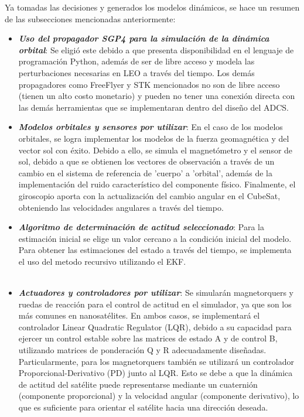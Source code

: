 Ya tomadas las decisiones y generados los modelos dinámicos, se hace un resumen de las subsecciones mencionadas anteriormente:

\begin{itemize}
	\item \textbf{\textit{Uso del propagador SGP4 para la simulación de la dinámica orbital}}: Se eligió este debido a que presenta disponibilidad en el lenguaje de programación Python, además de ser de libre acceso y modela las perturbaciones necesarias en LEO a través del tiempo. Los demás propagadores como FreeFlyer y STK mencionados no son de libre acceso (tienen un alto costo monetario) y pueden no tener una conexión directa con las demás herramientas que se implementaran dentro del diseño del \gls{ADCS}.
	
	\item \textbf{\textit{Modelos orbitales y sensores por utilizar}}: En el caso de los modelos orbitales, se logra implementar los modelos de la fuerza geomagnética y del vector sol con éxito. Debido a ello, se simula el magnetómetro y el sensor de sol, debido a que se obtienen los vectores de observación a través de un cambio en el sistema de referencia de 'cuerpo' a 'orbital', además de la implementación del ruido característico del componente físico. Finalmente, el giroscopio aporta con la actualización del cambio angular en el CubeSat, obteniendo las velocidades angulares a través del tiempo.
	
	\item\textbf{\textit{Algoritmo de determinación de actitud seleccionado}}: Para la estimación inicial se elige un valor cercano a la condición inicial del modelo. Para obtener las estimaciones del estado a través del tiempo, se implementa el uso del metodo recursivo utilizando el \gls{EKF}.
	\\
	\\
	\item \textbf{\textit{Actuadores y controladores por utilizar}}: Se simularán magnetorquers y ruedas de reacción para el control de actitud en el simulador, ya que son los más comunes en nanosatélites. En ambos casos, se implementará el controlador Linear Quadratic Regulator (LQR), debido a su capacidad para ejercer un control estable sobre las matrices de estado A y de control 	B, utilizando matrices de ponderación Q y R adecuadamente diseñadas. Particularmente, para los magnetorquers también se utilizará un controlador Proporcional-Derivativo (PD) junto al LQR. Esto se debe a que la dinámica de actitud del satélite puede representarse mediante un cuaternión (componente proporcional) y la velocidad angular (componente derivativo), lo que es suficiente para orientar el satélite hacia una dirección deseada.
\end{itemize}

